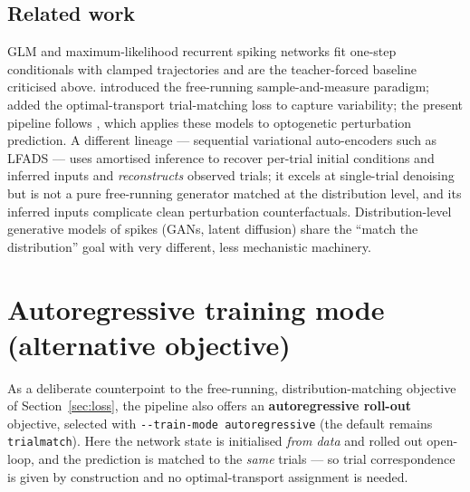\documentclass[11pt]{article}
\newcommand{\code}[1]{\texttt{#1}}
\begin{document}
\subsection{Related work}
GLM and maximum-likelihood recurrent spiking networks fit one-step conditionals
with clamped trajectories and are the teacher-forced baseline criticised above.
\cite{bellec2021} introduced the free-running sample-and-measure paradigm;
\cite{sourmpis2023} added the optimal-transport trial-matching loss to capture
variability; the present pipeline follows \cite{sourmpis2026}, which applies these
models to optogenetic perturbation prediction. A different lineage ---
sequential variational auto-encoders such as LFADS \cite{pandarinath2018} ---
uses amortised inference to recover per-trial initial conditions and inferred
inputs and \emph{reconstructs} observed trials; it excels at single-trial
denoising but is not a pure free-running generator matched at the distribution
level, and its inferred inputs complicate clean perturbation counterfactuals.
Distribution-level generative models of spikes (GANs, latent diffusion) share the
``match the distribution'' goal with very different, less mechanistic machinery.

\section{Autoregressive training mode (alternative objective)}
\label{sec:autoregressive}
As a deliberate counterpoint to the free-running, distribution-matching objective
of Section~\ref{sec:loss}, the pipeline also offers an \textbf{autoregressive
roll-out} objective, selected with \code{-{}-train-mode autoregressive} (the
default remains \code{trialmatch}). Here the network state is initialised
\emph{from data} and rolled out open-loop, and the prediction is matched to the
\emph{same} trials --- so trial correspondence is given by construction and no
optimal-transport assignment is needed.
\end{document}
